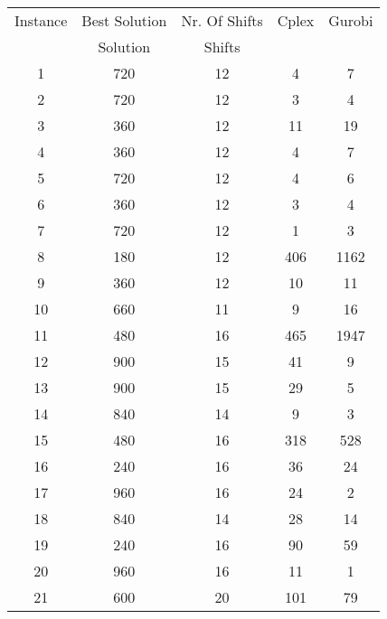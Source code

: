 \begin{table} \small
\centering
\begin{tabular}{ccccc}
\hline
 Instance & Best Solution & Nr. Of Shifts & Cplex & Gurobi   \\
  &  Solution & Shifts &  &    \\
\hline
1 &  720	& 12 & 4 & 7 \\

2 &  720	& 12 & 3 & 4  \\

3 &  360 	& 12 & 11 & 19   \\

4 &  360	& 12 & 4 & 7    \\

5 &  720	& 12 & 4 & 6 \\

6 &  360	& 12 & 3 & 4  \\

7 &  720	& 12 & 1 & 3  \\

8 &   180	& 12 & 406 & 1162 \\

9 &  360	& 12 & 10 & 11 \\

10&  660	& 11 & 9 & 16  \\

11 &  480	& 16 & 465 & 1947 \\

12 &  900	& 15 & 41 &  9 \\

13 &  900 	& 15 & 29 &  5 \\

14 &  840	& 14 & 9 &  3 \\

15 &  480	& 16 & 318 &  528   \\

16 &  240	& 16 & 36 & 24 \\

17 &  960	& 16 & 24 & 2  \\

18 &   840	& 14 & 28 &  14 \\

19 &  240	& 16 & 90 &  59 \\

20 &   960	& 16 & 11 & 1 \\

21 &  600	& 20 & 101 & 79   \\


\end{tabular}
\end{table}
